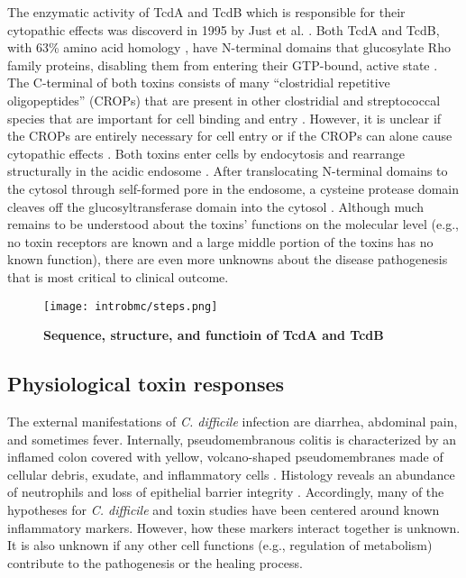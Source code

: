 The enzymatic activity of TcdA and TcdB which is responsible
for their cytopathic effects was discoverd 
in 1995 by Just et al. \cite{Just:1995ei,Just:1995kz}.
Both TcdA and TcdB, with 63\% amino acid
homology \cite{vonEichelStreiber:1992tg}, have N-terminal
domains that glucosylate Rho family proteins, disabling
them from entering their GTP-bound, active state \cite{Just:1995ei,Just:1995kz}.
The C-terminal of both toxins consists of many ``clostridial
repetitive oligopeptides'' (CROPs) that are present in 
other clostridial and streptococcal species 
\cite{vonEichelStreiber:1990ti,vonEichelStreiber:1992vb}
that are important for cell binding and 
entry \cite{Ho:2005vm,Greco:2006wf,Frisch:2003ul}.
However, it is unclear if the CROPs are entirely necessary
for cell entry or if the CROPs can alone cause
cytopathic effects \cite{Yeh:2008hd,Zemljic:2010ub}. Both toxins
enter cells by endocytosis and rearrange structurally
in the acidic endosome \cite{Papatheodorou:2010io,QaDan:2000fj}.
After translocating N-terminal domains to the cytosol through
self-formed pore in the endosome,
a cysteine protease domain cleaves off the glucosyltransferase
domain into the cytosol \cite{Egerer:2007fy,Genisyuerek:2011dr,Pfeifer:2003bx}.
Although much remains to be understood about the 
toxins' functions on the molecular level (e.g., no toxin receptors are known and
a large middle portion of the toxins has no known function), there
are even more unknowns about the disease pathogenesis that
is most critical to clinical outcome.

\begin{figure}[b!]
  \centering
  \texttt{[image: introbmc/steps.png]}
  \caption[Sequence, structure, and functioin of TcdA and TcdB]
  {\textbf{Sequence, structure, and functioin of TcdA and TcdB}}
  \label{introbmc:steps}
\end{figure}

\subsection{Physiological toxin responses}
The external manifestations of \textit{C. difficile} infection 
are diarrhea, abdominal pain, and sometimes fever.
Internally, pseudomembranous colitis is characterized by
an inflamed colon covered with yellow, volcano-shaped 
pseudomembranes made of cellular debris, exudate,
and inflammatory cells \cite{Tedesco:1974jo}. 
Histology reveals an abundance of neutrophils and
loss of epithelial barrier integrity \cite{Lyerly:1988dk,Kelly:1994cu}.
Accordingly, many of the hypotheses for \textit{C. difficile}
and toxin studies have been centered around known inflammatory
markers. However, how these markers interact together
is unknown. It is also unknown if any other cell functions
(e.g., regulation of metabolism) contribute to the pathogenesis
or the healing process.


